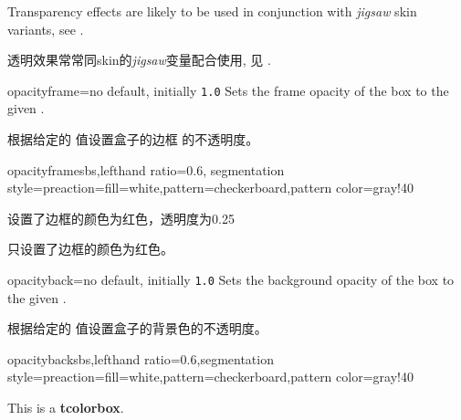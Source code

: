 \begin{marker}
Transparency effects are likely to be used in conjunction with \emph{jigsaw}
skin variants, see .

透明效果常常同skin的\emph{jigsaw}变量配合使用, 见 .
\end{marker}

\begin{docTcbKey}{opacityframe}{=}{no default, initially \texttt{1.0}}
Sets the frame opacity of the box to the given .

根据给定的  值设置盒子的边框%
的不透明度。
\begin{exdispExample*}{opacityframe}{sbs,lefthand ratio=0.6,
segmentation style={preaction={fill=white},pattern=checkerboard,pattern color=gray!40}
}
\begin{tcolorbox}[opacityframe=0.25
,title=设置了边框的颜色和透明度,
colframe=red]
设置了边框的颜色为红色，透明度为0.25
\end{tcolorbox}
\begin{tcolorbox}[colframe=red
,title=设置了边框的颜色]
只设置了边框的颜色为红色。
\end{tcolorbox}
\end{exdispExample*}
\end{docTcbKey}


\begin{docTcbKey}{opacityback}{=}{no default, initially \texttt{1.0}}
Sets the background opacity of the box to the given .

根据给定的  值设置盒子的背景色的不透明度。
\begin{exdispExample*}{opacityback}{sbs,lefthand ratio=0.6,segmentation style={preaction={fill=white},pattern=checkerboard,pattern color=gray!40}}
\begin{tcolorbox}[standard jigsaw,colframe=red,
opacityframe=0.5, opacityback=0.5]
This is a \textbf{tcolorbox}.
\end{tcolorbox}
\end{exdispExample*}
\end{docTcbKey}

